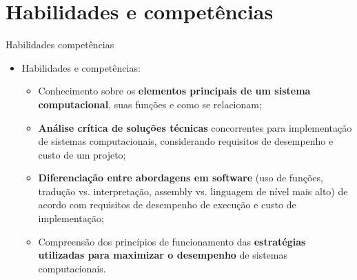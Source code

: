     \section[slide=true]{Habilidades e competências}
      \begin{slide}[toc=]{Habilidades competências}
         \begin{itemize}
	     \item Habilidades e competências:
		     \begin{itemize}
			     \item Conhecimento sobre os \textbf{elementos principais de um sistema computacional}, suas funções e como se relacionam;
			     \item \textbf{Análise crítica de soluções técnicas} concorrentes para implementação de sistemas computacionais, considerando requisitos de desempenho e custo de um projeto;
			     \item \textbf{Diferenciação entre abordagens em software} (uso de funções, tradução vs. interpretação, assembly vs. linguagem de nível mais alto) de acordo com requisitos de desempenho de execução e custo de implementação;
			     \item Compreensão dos princípios de funcionamento das \textbf{estratégias utilizadas para maximizar o desempenho} de sistemas computacionais.
	            \end{itemize}
         \end{itemize}
      \end{slide}

